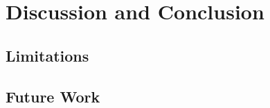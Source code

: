 \section{Discussion and Conclusion}\label{sec:conclusion}

\subsection{Limitations}

\subsection{Future Work}
